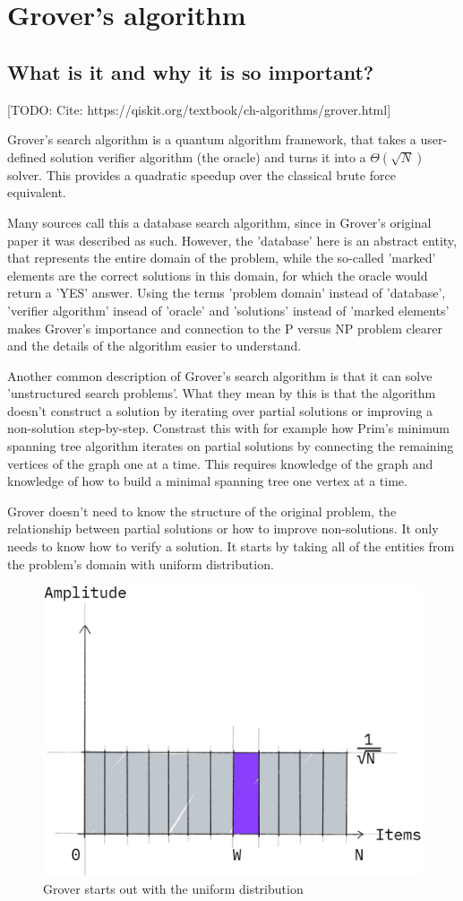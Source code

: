 \chapter{Grover's algorithm}

\section{What is it and why it is so important?}

[TODO: Cite: https://qiskit.org/textbook/ch-algorithms/grover.html]

Grover's search algorithm is a quantum algorithm framework, that takes a user-defined solution verifier algorithm (the oracle) and turns it into a $\Theta(\sqrt{N})$ solver. This provides a quadratic speedup over the classical brute force equivalent.

Many sources call this a database search algorithm, since in Grover's original paper it was described as such. However, the 'database' here is an abstract entity, that represents the entire domain of the problem, while the so-called 'marked' elements are the correct solutions in this domain, for which the oracle would return a 'YES' answer. Using the terms 'problem domain' instead of 'database', 'verifier algorithm' insead of 'oracle' and 'solutions' instead of 'marked elements' makes Grover's importance and connection to the P versus NP problem clearer and the details of the algorithm easier to understand.

Another common description of Grover's search algorithm is that it can solve 'unstructured search problems'. What they mean by this is that the algorithm doesn't construct a solution by iterating over partial solutions or improving a non-solution step-by-step. Constrast this with for example how Prim's minimum spanning tree algorithm iterates on partial solutions by connecting the remaining vertices of the graph one at a time. This requires knowledge of the graph and knowledge of how to build a minimal spanning tree one vertex at a time.

Grover doesn't need to know the structure of the original problem, the relationship between partial solutions or how to improve non-solutions. It only needs to know how to verify a solution. It starts by taking all of the entities from the problem's domain with uniform distribution.

\begin{figure}[H]
    \centering
    \includegraphics[width=0.5\linewidth]{content/assets/03_grovers_algorithm/grover_uniform.jpg}
    \caption{Grover starts out with the uniform distribution}
    \label{fig:grover_uniform}
\end{figure}

